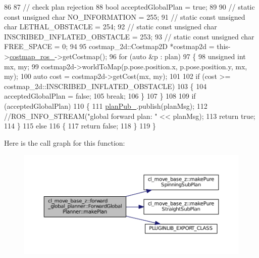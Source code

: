 \begin{DoxyCode}
86 
87     \textcolor{comment}{// check plan rejection}
88     \textcolor{keywordtype}{bool} acceptedGlobalPlan = \textcolor{keyword}{true};
89 
90     \textcolor{comment}{// static const unsigned char NO\_INFORMATION = 255;}
91     \textcolor{comment}{// static const unsigned char LETHAL\_OBSTACLE = 254;}
92     \textcolor{comment}{// static const unsigned char INSCRIBED\_INFLATED\_OBSTACLE = 253;}
93     \textcolor{comment}{// static const unsigned char FREE\_SPACE = 0;}
94 
95     costmap\_2d::Costmap2D *costmap2d = this->\hyperlink{classcl__move__base__z_1_1forward__global__planner_1_1ForwardGlobalPlanner_a711d4a0d92a216eb8cab3b42f18eb795}{costmap\_ros\_}->getCostmap();
96     \textcolor{keywordflow}{for} (\textcolor{keyword}{auto} &p : plan)
97     \{
98         \textcolor{keywordtype}{unsigned} \textcolor{keywordtype}{int} mx, my;
99         costmap2d->worldToMap(p.pose.position.x, p.pose.position.y, mx, my);
100         \textcolor{keyword}{auto} cost = costmap2d->getCost(mx, my);
101 
102         \textcolor{keywordflow}{if} (cost >= costmap\_2d::INSCRIBED\_INFLATED\_OBSTACLE)
103         \{
104             acceptedGlobalPlan = \textcolor{keyword}{false};
105             \textcolor{keywordflow}{break};
106         \}
107     \}
108 
109     \textcolor{keywordflow}{if} (acceptedGlobalPlan)
110     \{
111         \hyperlink{classcl__move__base__z_1_1forward__global__planner_1_1ForwardGlobalPlanner_a927dc6a687fac3751033d9736cf8dfcf}{planPub\_}.publish(planMsg);
112         \textcolor{comment}{//ROS\_INFO\_STREAM("global forward plan: " << planMsg);}
113         \textcolor{keywordflow}{return} \textcolor{keyword}{true};
114     \}
115     \textcolor{keywordflow}{else}
116     \{
117         \textcolor{keywordflow}{return} \textcolor{keyword}{false};
118     \}
119 \}
\end{DoxyCode}


Here is the call graph for this function\+:
\nopagebreak
\begin{figure}[H]
\begin{center}
\leavevmode
\includegraphics[width=350pt]{classcl__move__base__z_1_1forward__global__planner_1_1ForwardGlobalPlanner_a9d7c48877a390ca3cc580a7ffa50d316_cgraph}
\end{center}
\end{figure}




